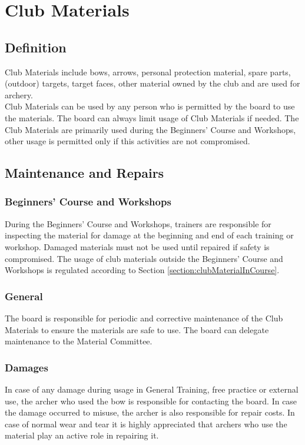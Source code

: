 \documentclass[a4paper]{article}
\begin{document}
\section{Club Materials}
\subsection{Definition}
Club Materials include bows, arrows, personal protection material, spare parts, (outdoor) targets, target faces, other material owned by the club and are used for archery. \\

Club Materials can be used by any person who is permitted by the board to use the materials. The board can always limit usage of Club Materials if needed. The Club Materials are primarily used during the Beginners' Course and Workshops, other usage is permitted only if this activities are not compromised.

\subsection{Maintenance and Repairs}
\subsubsection{Beginners' Course and Workshops}
During the Beginners' Course and Workshops, trainers are responsible for inspecting the material for damage at the beginning and end of each training or workshop. Damaged materials must not be used until repaired if safety is compromised. The usage of club materials outside the Beginners' Course and Workshops is regulated according to Section \ref{section:clubMaterialInCourse}.

\subsubsection{General}
The board is responsible for periodic and corrective maintenance of the Club Materials to ensure the materials are safe to use. The board can delegate maintenance to the Material Committee. 

\subsubsection{Damages}
In case of any damage during usage in General Training, free practice or external use, the archer who used the bow is responsible for contacting the board. In case the damage occurred to misuse, the archer is also responsible for repair costs. In case of normal wear and tear it is highly appreciated that archers who use the material play an active role in repairing it.
\end{document}
